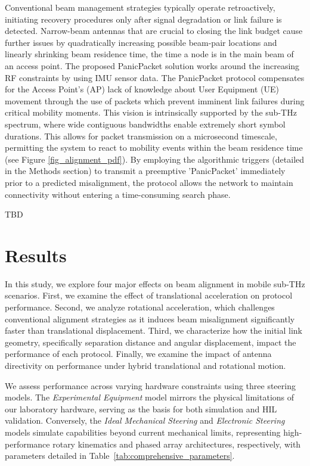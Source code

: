 \documentclass[fleqn,10pt]{wlscirep}
\begin{document}
Conventional beam management strategies typically operate retroactively, initiating recovery procedures only after signal degradation or link failure is detected. Narrow-beam antennas that are crucial to closing the link budget cause further issues by quadratically increasing possible beam-pair locations and linearly shrinking beam residence time, the time a node is in the main beam of an access point. The proposed PanicPacket solution works around the increasing RF constraints by using IMU sensor data. The PanicPacket protocol compensates for the Access Point's (AP) lack of knowledge about User Equipment (UE) movement through the use of packets which prevent imminent link failures during critical mobility moments. This vision is intrinsically supported by the sub-THz spectrum, where wide contiguous bandwidths enable extremely short symbol durations. This allows for packet transmission on a microsecond timescale, permitting the system to react to mobility events within the beam residence time (see Figure \ref{fig_alignment_pdf}). By employing the algorithmic triggers (detailed in the Methods section) to transmit a preemptive 'PanicPacket' immediately prior to a predicted misalignment, the protocol allows the network to maintain connectivity without entering a time-consuming search phase.

TBD

\section*{Results}

In this study, we explore four major effects on beam alignment in mobile sub-THz scenarios. First, we examine the effect of translational acceleration on protocol performance. Second, we analyze rotational acceleration, which challenges conventional alignment strategies as it induces beam misalignment significantly faster than translational displacement. Third, we characterize how the initial link geometry, specifically separation distance and angular displacement, impact the performance of each protocol. Finally, we examine the impact of antenna directivity on performance under hybrid translational and rotational motion.

We assess performance across varying hardware constraints using three steering models. The \textit{Experimental Equipment} model mirrors the physical limitations of our laboratory hardware, serving as the basis for both simulation and HIL validation. Conversely, the \textit{Ideal Mechanical Steering} and \textit{Electronic Steering} models simulate capabilities beyond current mechanical limits, representing high-performance rotary kinematics and phased array architectures, respectively, with parameters detailed in Table~\ref{tab:comprehensive_parameters}.
\end{document}
